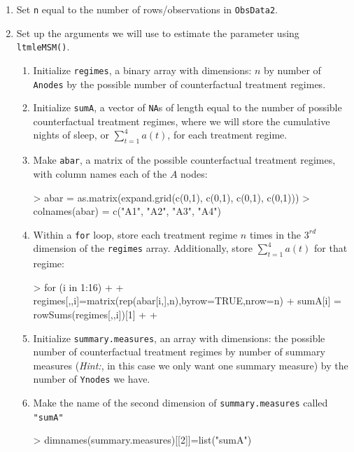 \documentclass[answers]{exam}
\begin{document}
\begin{enumerate}
\item Set \texttt{n} equal to the number of rows/observations in \texttt{ObsData2}.
\item Set up the arguments we will use to estimate the parameter using \texttt{ltmleMSM()}.
\begin{enumerate}
\item Initialize \texttt{regimes}, a binary array with dimensions: $n$ by number of \texttt{Anodes} by the possible number of counterfactual treatment regimes.
\item Initialize \texttt{sumA}, a vector of \texttt{NA}s of length equal to the number of possible counterfactual treatment regimes, where we will store the cumulative nights of sleep, or $\sum_{t=1}^4a(t)$, for each treatment regime.
\item Make \texttt{abar}, a matrix of the possible counterfactual treatment regimes, with column names each of the $A$ nodes:
\begin{Schunk}
\begin{Sinput}
> abar = as.matrix(expand.grid(c(0,1), c(0,1), c(0,1), c(0,1)))
> colnames(abar) = c("A1", "A2", "A3", "A4")
\end{Sinput}
\end{Schunk}
\item Within a \texttt{for} loop, store each treatment regime $n$ times in the $3^{rd}$ dimension of the \texttt{regimes} array. Additionally, store $\sum_{t=1}^4a(t)$ for that regime:
\begin{Schunk}
\begin{Sinput}
> for (i in 1:16){
+   
+   regimes[,,i]=matrix(rep(abar[i,],n),byrow=TRUE,nrow=n)
+   sumA[i] = rowSums(regimes[,,i])[1]
+   
+ }
\end{Sinput}
\end{Schunk}
\item Initialize \texttt{summary.measures}, an array with dimensions: the possible number of counterfactual treatment regimes by number of summary measures (\textit{Hint:}, in this case we only want one summary measure) by the number of \texttt{Ynodes} we have.
\item Make the name of the second dimension of \texttt{summary.measures} called \texttt{"sumA"}
\begin{Schunk}
\begin{Sinput}
> dimnames(summary.measures)[[2]]=list("sumA")
\end{Sinput}
\end{Schunk}

\end{enumerate}
\end{enumerate}
\end{document}
